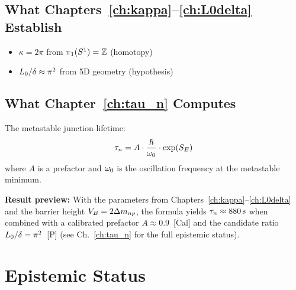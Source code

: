 \subsection{What Chapters~\ref{ch:kappa}--\ref{ch:L0delta} Establish}

\begin{itemize}
    \item $\kappa = 2\pi$ from $\pi_1(S^1) = \mathbb{Z}$ (homotopy)
    \item $L_0/\delta \approx \pi^2$ from 5D geometry (hypothesis)
\end{itemize}

\subsection{What Chapter~\ref{ch:tau_n} Computes}

The metastable junction lifetime:
\begin{equation}
    \tau_n = A \cdot \frac{\hbar}{\omega_0} \cdot \exp(S_E)
\end{equation}
where $A$ is a prefactor and $\omega_0$ is the oscillation frequency at the
metastable minimum.

\textbf{Result preview:} With the parameters from Chapters~\ref{ch:kappa}--\ref{ch:L0delta}
and the barrier height $V_B = 2\Delta m_{np}$, the formula yields $\tau_n \approx 880\,\mathrm{s}$
when combined with a calibrated prefactor $A \approx 0.9$~[Cal] and the candidate
ratio $L_0/\delta = \pi^2$~[P] (see Ch.~\ref{ch:tau_n} for the full epistemic status).

\section{Epistemic Status}
\label{sec:metastable:epistemic}

